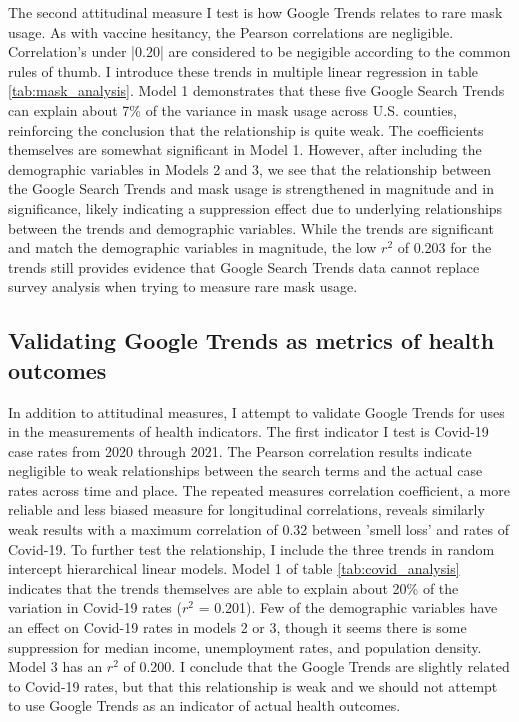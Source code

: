 

The second attitudinal measure I test is how Google Trends relates to rare mask
usage. As with vaccine hesitancy, the Pearson correlations are negligible.
Correlation's under |0.20| are considered to be negigible according to the
common rules of thumb. I introduce these trends in multiple linear regression in
table \ref{tab:mask_analysis}. Model 1 demonstrates that these five Google
Search Trends can explain about 7\% of the variance in mask usage across U.S.
counties, reinforcing the conclusion that the relationship is quite weak. The
coefficients themselves are somewhat significant in Model 1. However, after
including the demographic variables in Models 2 and 3, we see that the
relationship between the Google Search Trends and mask usage is strengthened in
magnitude and in significance, likely indicating a suppression effect due to
underlying relationships between the trends and demographic variables. While the
trends are significant and match the demographic variables in magnitude, the
low $r^2$ of 0.203 for the trends still provides evidence that Google Search
Trends data cannot replace survey analysis when trying to measure rare mask
usage.



\subsection{Validating Google Trends as metrics of health outcomes}

In addition to attitudinal measures, I attempt to validate Google Trends for
uses in the measurements of health indicators. The first indicator I test is
Covid-19 case rates from 2020 through 2021. The Pearson correlation results
indicate negligible to weak relationships between the search terms and the
actual case rates across time and place. The repeated measures correlation
coefficient, a more reliable and less biased measure for longitudinal
correlations, reveals similarly weak results with a maximum correlation of 0.32
between 'smell loss' and rates of Covid-19. To further test the relationship, I
include the three trends in random intercept hierarchical linear models. Model 1
of table \ref{tab:covid_analysis} indicates that the trends themselves are able
to explain about 20\% of the variation in Covid-19 rates ($r^2$ = 0.201). Few
of the demographic variables have an effect on Covid-19 rates in models 2 or 3,
though it seems there is some suppression for median income, unemployment rates,
and population density. Model 3 has an $r^2$ of 0.200. I conclude that the
Google Trends are slightly related to Covid-19 rates, but that this relationship
is weak and we should not attempt to use Google Trends as an indicator of actual
health outcomes.


